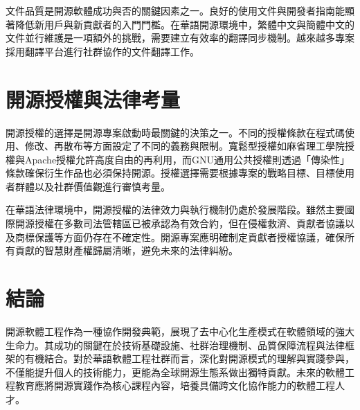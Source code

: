 \documentclass[
    language=traditionalchinese,
    doctype=article,
]{../../omnilatex}
\begin{document}
文件品質是開源軟體成功與否的關鍵因素之一。良好的使用文件與開發者指南能顯著降低新用戶與新貢獻者的入門門檻。在華語開源環境中，繁體中文與簡體中文的文件並行維護是一項額外的挑戰，需要建立有效率的翻譯同步機制。越來越多專案採用翻譯平台進行社群協作的文件翻譯工作。

\section{開源授權與法律考量}
開源授權的選擇是開源專案啟動時最關鍵的決策之一。不同的授權條款在程式碼使用、修改、再散布等方面設定了不同的義務與限制。寬鬆型授權如麻省理工學院授權與Apache授權允許高度自由的再利用，而GNU通用公共授權則透過「傳染性」條款確保衍生作品也必須保持開源。授權選擇需要根據專案的戰略目標、目標使用者群體以及社群價值觀進行審慎考量。

在華語法律環境中，開源授權的法律效力與執行機制仍處於發展階段。雖然主要國際開源授權在多數司法管轄區已被承認為有效合約，但在侵權救濟、貢獻者協議以及商標保護等方面仍存在不確定性。開源專案應明確制定貢獻者授權協議，確保所有貢獻的智慧財產權歸屬清晰，避免未來的法律糾紛。

\section{結論}
開源軟體工程作為一種協作開發典範，展現了去中心化生產模式在軟體領域的強大生命力。其成功的關鍵在於技術基礎設施、社群治理機制、品質保障流程與法律框架的有機結合。對於華語軟體工程社群而言，深化對開源模式的理解與實踐參與，不僅能提升個人的技術能力，更能為全球開源生態系做出獨特貢獻。未來的軟體工程教育應將開源實踐作為核心課程內容，培養具備跨文化協作能力的軟體工程人才。
\end{document}
